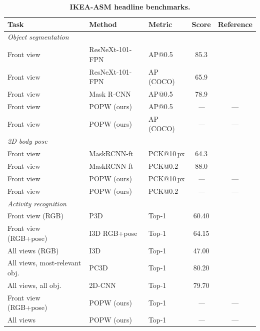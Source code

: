 \documentclass[11pt,a4paper]{article}
\newcommand{\popw}{POPW}
\newcommand{\ikea}{IKEA-ASM}
\newcommand{\todo}{\textit{---}}
\newcommand{\popwres}{\todo}
\begin{document}
\begin{table}[!htbp]
\centering
\small
\caption{\textbf{\ikea{} headline benchmarks.}}
\label{tab:ikea-headline}
\begin{tabular}{l l l c c}
\toprule
\textbf{Task} & \textbf{Method} & \textbf{Metric} & \textbf{Score} & \textbf{Reference} \\
\midrule
\multicolumn{5}{l}{\textit{Object segmentation}} \\
Front view & ResNeXt-101-FPN  & AP@0.5         & 85.3 & \cite{benshabat2021ikea} \\
Front view & ResNeXt-101-FPN  & AP (COCO)      & 65.9 & \cite{benshabat2021ikea} \\
Front view & Mask R-CNN       & AP@0.5         & 78.9 & \cite{benshabat2021ikea} \\
Front view & \popw{} (ours)   & AP@0.5         & \popwres & --- \\
Front view & \popw{} (ours)   & AP (COCO)      & \popwres & --- \\
\midrule
\multicolumn{5}{l}{\textit{2D body pose}} \\
Front view & MaskRCNN-ft      & PCK@10\,px     & 64.3 & \cite{benshabat2021ikea} \\
Front view & MaskRCNN-ft      & PCK@0.2        & 88.0 & \cite{benshabat2021ikea} \\
Front view & \popw{} (ours)   & PCK@10\,px     & \popwres & --- \\
Front view & \popw{} (ours)   & PCK@0.2        & \popwres & --- \\
\midrule
\multicolumn{5}{l}{\textit{Activity recognition}} \\
Front view (RGB)        & P3D                  & Top-1   & 60.40 & \cite{benshabat2021ikea} \\
Front view (RGB+pose)   & I3D RGB+pose         & Top-1   & 64.15 & \cite{benshabat2021ikea} \\
All views (RGB)         & I3D                  & Top-1   & 47.00 & \cite{benshabat2021ikea} \\
All views, most-relevant obj. & PC3D~\cite{aganian2023ikea}     & Top-1 & 80.20 & \cite{aganian2023ikea} \\
All views, all obj.     & 2D-CNN~\cite{aganian2023ikea}        & Top-1 & 79.70 & \cite{aganian2023ikea} \\
Front view (RGB+pose)   & \popw{} (ours)       & Top-1   & \popwres & --- \\
All views               & \popw{} (ours)       & Top-1   & \popwres & --- \\

\end{tabular}
\end{table}
\end{document}
